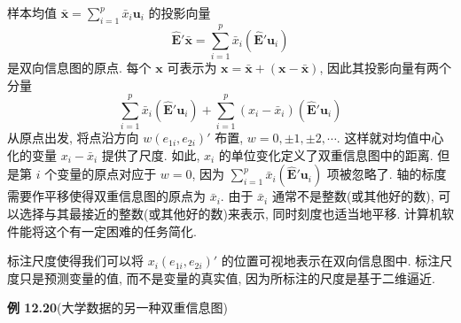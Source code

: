 
样本均值 $\bar{\mathbf{x}}=\sum_{i=1}^{p}\bar{x}_i\mathbf{u}_i$ 的投影向量
\[
\hat{\mathbf{E}}'\bar{\mathbf{x}}=\sum_{i=1}^{p}\bar{x}_i(\hat{\mathbf{E}}'\mathbf{u}_i)
\]
是双向信息图的原点. 每个 $\mathbf{x}$ 可表示为 $\mathbf{x}=\bar{\mathbf{x}}+(\mathbf{x}-\bar{\mathbf{x}})$, 因此其投影向量有两个分量
\[
\sum_{i=1}^{p}\bar{x}_i(\hat{\mathbf{E}}'\mathbf{u}_i)+\sum_{i=1}^{p}(x_i-\bar{x}_i)(\hat{\mathbf{E}}'\mathbf{u}_i)
\]
从原点出发, 将点沿方向 $w(e_{1i},e_{2i})'$ 布置, $w=0,\pm1,\pm2,\cdots$. 这样就对均值中心化的变量 $x_i-\bar{x}_i$ 提供了尺度. 如此, $x_i$ 的单位变化定义了双重信息图中的距离. 但是第 $i$ 个变量的原点对应于 $w=0$, 因为 $\sum_{i=1}^{p}\bar{x}_i(\hat{\mathbf{E}}'\mathbf{u}_i)$ 项被忽略了. 轴的标度需要作平移使得双重信息图的原点为 $\bar{x}_i$. 由于 $\bar{x}_i$ 通常不是整数(或其他好的数), 可以选择与其最接近的整数(或其他好的数)来表示, 同时刻度也适当地平移. 计算机软件能将这个有一定困难的任务简化.

标注尺度使得我们可以将 $x_i(e_{1i},e_{2i})'$ 的位置可视地表示在双向信息图中. 标注尺度只是预测变量的值, 而不是变量的真实值, 因为所标注的尺度是基于二维逼近.

\noindent\textbf{例 12.20}\quad (大学数据的另一种双重信息图)

\begin{mvfigure}
\label{fig:12.25}
\end{mvfigure}
